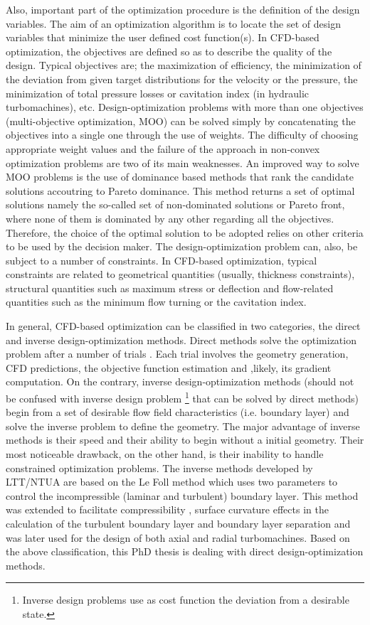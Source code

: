 Also, important part of the optimization procedure is the definition of the design variables. The aim of an optimization algorithm is to locate the set of design variables that minimize the user defined cost function(s).  In CFD-based optimization, the objectives are defined so as to describe the quality of the design. Typical objectives are; the maximization of efficiency, the minimization of the deviation from given target distributions for the velocity or the pressure, the minimization of total pressure losses or cavitation index (in hydraulic turbomachines), etc.  Design-optimization problems with more than one objectives (multi-objective optimization, MOO) can be solved simply by concatenating the objectives into a single one through the use of weights. The difficulty of choosing appropriate weight values and the failure of the approach in non-convex optimization problems are two of its main weaknesses.  An improved way to solve MOO problems is the use of dominance based methods that rank the candidate solutions accoutring to Pareto dominance. This method returns a set of optimal solutions namely the so-called set of non-dominated solutions or Pareto front, where none of them  is dominated by any other regarding all the objectives.  Therefore, the choice of the optimal solution to be adopted relies on other criteria to be used by the decision maker.  The design-optimization problem can, also, be subject to a number of constraints. In CFD-based optimization, typical constraints are related to geometrical quantities (usually, thickness constraints), structural quantities such as maximum stress or deflection and flow-related quantities such as the minimum flow turning or the cavitation index.          

In general, CFD-based optimization can be classified in two categories, the direct and inverse design-optimization methods. Direct methods solve the optimization problem after a number of trials \cite{phd_Giotis,phd_Kampolis,phd:papadim,kn:Emm2002,kn:Emm2004}. Each trial involves the geometry generation, CFD predictions, the objective function estimation and ,likely, its gradient computation.  On the contrary, inverse design-optimization methods (should not be confused with inverse design problem \footnote{Inverse design problems use as cost function the deviation from a desirable state.} that can be solved by direct methods) \cite{chav:95,ded:95} begin from a set of desirable flow field characteristics (i.e. boundary layer) and solve the inverse problem to define the geometry. The major advantage of inverse methods is their speed and their ability to begin without a initial geometry. Their most noticeable drawback, on the other hand, is their inability to handle constrained optimization problems. The inverse methods developed by LTT/NTUA are based on the Le Foll method \cite{lefoll} which uses two parameters to control the incompressible (laminar and turbulent) boundary layer. This method was extended to facilitate compressibility \cite{pap69}, surface curvature effects in the calculation of the turbulent boundary layer \cite{pap70} and boundary layer separation \cite{pap81} and was later used for the design of both axial and radial turbomachines. Based on the above classification, this PhD thesis is dealing with direct design-optimization methods.  

